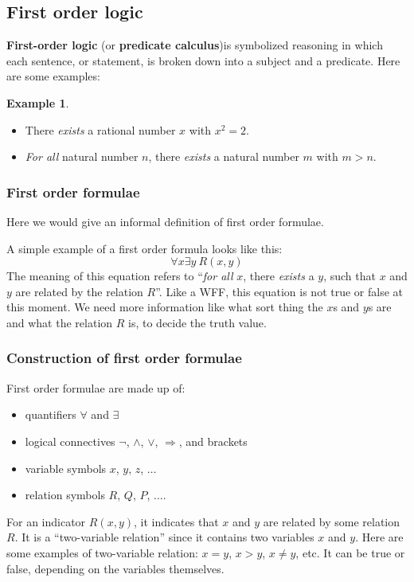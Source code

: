\documentclass[11pt]{article}
\theoremstyle{definition}
\newtheorem{eg}{Example}[subsection]
\begin{document}
\subsection{First order logic}
\textbf{First-order logic} (or \textbf{predicate calculus})is symbolized reasoning in which each sentence, or statement, is broken down into a subject and a predicate. Here are some examples:
\begin{eg}
    \quad
    \begin{itemize}
        \item There \textit{exists} a rational number $x$ with $x^2=2$.
        \item \textit{For all} natural number $n$, there \textit{exists} a natural number $m$ with $m>n$.
    \end{itemize}
\end{eg}

\subsubsection{First order formulae}
Here we would give an informal definition of first order formulae.

A simple example of a first order formula looks like this:
\begin{equation}
    \forall x \exists y \: R(x,y)
\end{equation}
The meaning of this equation refers to ``\textit{for all} $x$, there \textit{exists} a $y$, such that $x$ and $y$ are related by the relation $R$''. Like a WFF, this equation is not true or false at this moment. We need more information like what sort thing the $x$s and $y$s are and what the relation $R$ is, to decide the truth value.

\subsubsection{Construction of first order formulae}
First order formulae are made up of:
\begin{itemize}
    \item quantifiers $\forall$ and $\exists$
    \item logical connectives $\neg$, $\wedge$, $\vee$, $\Rightarrow$, and brackets
    \item variable symbols $x$, $y$, $z$, $\dots$
    \item relation symbols $R$, $Q$, $P$, $\dots$.
\end{itemize}

For an indicator $R(x,y)$, it indicates that $x$ and $y$ are related by some relation $R$. It is a ``two-variable relation'' since it contains two variables $x$ and $y$. Here are some examples of two-variable relation: $x=y$, $x>y$, $x \neq y$, etc. It can be true or false, depending on the variables themselves.
\end{document}
